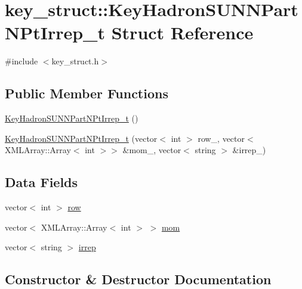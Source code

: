 \hypertarget{structkey__struct_1_1KeyHadronSUNNPartNPtIrrep__t}{}\section{key\+\_\+struct\+:\+:Key\+Hadron\+S\+U\+N\+N\+Part\+N\+Pt\+Irrep\+\_\+t Struct Reference}
\label{structkey__struct_1_1KeyHadronSUNNPartNPtIrrep__t}


{\ttfamily \#include $<$key\+\_\+struct.\+h$>$}

\subsection*{Public Member Functions}
\begin{DoxyCompactItemize}
\item 
\mbox{\hyperlink{structkey__struct_1_1KeyHadronSUNNPartNPtIrrep__t_a4127a0afd410de68d1b0aea1e6713883}{Key\+Hadron\+S\+U\+N\+N\+Part\+N\+Pt\+Irrep\+\_\+t}} ()
\item 
\mbox{\hyperlink{structkey__struct_1_1KeyHadronSUNNPartNPtIrrep__t_acc0c81a51593d453d3b4361f40aec3bf}{Key\+Hadron\+S\+U\+N\+N\+Part\+N\+Pt\+Irrep\+\_\+t}} (vector$<$ int $>$ row\+\_\+, vector$<$ X\+M\+L\+Array\+::\+Array$<$ int $>$$>$ \&mom\+\_\+, vector$<$ string $>$ \&irrep\+\_\+)
\end{DoxyCompactItemize}
\subsection*{Data Fields}
\begin{DoxyCompactItemize}
\item 
vector$<$ int $>$ \mbox{\hyperlink{structkey__struct_1_1KeyHadronSUNNPartNPtIrrep__t_abf2e067ab900ef89c51b00867cc176ff}{row}}
\item 
vector$<$ X\+M\+L\+Array\+::\+Array$<$ int $>$ $>$ \mbox{\hyperlink{structkey__struct_1_1KeyHadronSUNNPartNPtIrrep__t_ad3b5d985478c4f7c3aae5f6f64ee3e40}{mom}}
\item 
vector$<$ string $>$ \mbox{\hyperlink{structkey__struct_1_1KeyHadronSUNNPartNPtIrrep__t_ae50078792a27344f3cc30eef0167c551}{irrep}}
\end{DoxyCompactItemize}


\subsection{Constructor \& Destructor Documentation}
\mbox{\label{structkey__struct_1_1KeyHadronSUNNPartNPtIrrep__t_a4127a0afd410de68d1b0aea1e6713883}} 
